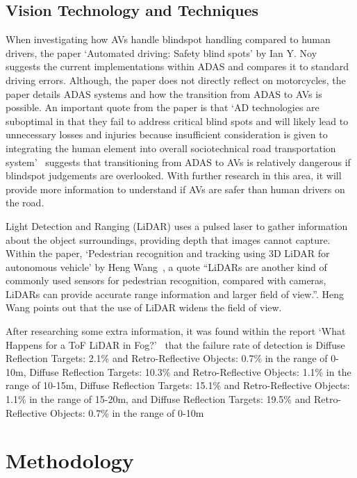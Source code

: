 \documentclass[conference]{IEEEtran}
\begin{document}
	\subsection{Vision Technology and Techniques}
		When investigating how AVs handle blindspot handling compared to human drivers, the paper `Automated driving: Safety blind spots' by Ian Y. Noy~\cite{noy_automated_2018} suggests the current implementations within ADAS and compares it to standard driving errors. Although, the paper does not directly reflect on motorcycles, the paper details ADAS systems and how the transition from ADAS to AVs is possible. An important quote from the paper is that `AD technologies are suboptimal in that they fail to address critical blind spots and will likely lead to unnecessary losses and injuries because insufficient consideration is given to integrating the human element into overall sociotechnical road transportation system'~\cite{noy_automated_2018} suggests that transitioning from ADAS to AVs is relatively dangerous if blindspot judgements are overlooked. With further research in this area, it will provide more information to understand if AVs are safer than human drivers on the road.

		Light Detection and Ranging (LiDAR) uses a pulsed laser to gather information about the object surroundings, providing depth that images cannot capture. Within the paper, `Pedestrian recognition and tracking using 3D LiDAR for autonomous vehicle' by Heng Wang~\cite{wang_pedestrian_2017}, a quote ``LiDARs are another kind of commonly used sensors for pedestrian recognition, compared with cameras, LiDARs can provide accurate range information and larger field of view.''. Heng Wang points out that the use of LiDAR widens the field of view.
		
		After researching some extra information, it was found within the report `What Happens for a ToF LiDAR in Fog?'~\cite{li_what_2021} that the failure rate of detection is Diffuse Reflection Targets: 2.1\% and Retro-Reflective Objects: 0.7\% in the range of 0-10m, Diffuse Reflection Targets: 10.3\% and Retro-Reflective Objects: 1.1\% in the range of 10-15m, Diffuse Reflection Targets: 15.1\% and Retro-Reflective Objects: 1.1\% in the range of 15-20m, and Diffuse Reflection Targets: 19.5\% and Retro-Reflective Objects: 0.7\% in the range of 0-10m~\cite{royo_overview_2019}

\section{Methodology}
\end{document}
